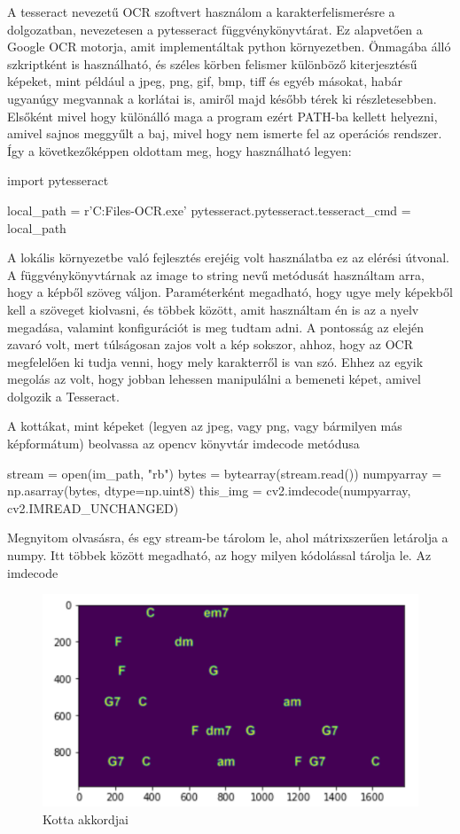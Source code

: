 A tesseract nevezetű OCR szoftvert használom a karakterfelismerésre a dolgozatban, nevezetesen a pytesseract függvénykönyvtárat. Ez alapvetően a Google OCR motorja, amit implementáltak python környezetben. Önmagába álló szkriptként is használható, és széles körben felismer különböző kiterjesztésű képeket, mint például a jpeg, png, gif, bmp, tiff és egyéb másokat, habár ugyanúgy megvannak a korlátai is, amiről majd később térek ki részletesebben. Elsőként mivel hogy különálló maga a program ezért PATH-ba kellett helyezni, amivel sajnos meggyűlt a baj, mivel hogy nem ismerte fel az operációs rendszer. Így a következőképpen oldottam meg, hogy használható legyen:
\begin{python}
	import pytesseract
	
	local_path =  r'C:\Program Files\Tesseract-OCR\tesseract.exe'
	pytesseract.pytesseract.tesseract_cmd = local_path
\end{python}
A lokális környezetbe való fejlesztés erejéig volt használatba ez az elérési útvonal. A függvénykönyvtárnak az image to string nevű metódusát használtam arra, hogy a képből szöveg váljon. Paraméterként megadható, hogy ugye mely képekből kell a szöveget kiolvasni, és többek között, amit használtam én is az a nyelv megadása, valamint konfigurációt is meg tudtam adni. A pontosság az elején zavaró volt, mert túlságosan zajos volt a kép sokszor, ahhoz, hogy az OCR megfelelően ki tudja venni, hogy mely karakterről is van szó. Ehhez az egyik megolás az volt, hogy jobban lehessen manipulálni a bemeneti képet, amivel dolgozik a Tesseract.
\par
{}
A kottákat, mint képeket (legyen az jpeg, vagy png, vagy bármilyen más képformátum) beolvassa az opencv könyvtár imdecode metódusa
\begin{python}
stream = open(im_path, "rb")
bytes = bytearray(stream.read())
numpyarray = np.asarray(bytes, dtype=np.uint8)
this_img = cv2.imdecode(numpyarray, cv2.IMREAD_UNCHANGED)
\end{python}
Megnyitom olvasásra, és egy stream-be tárolom le, ahol mátrixszerűen letárolja a numpy. Itt többek között megadható, az hogy milyen kódolással tárolja le. Az imdecode

\begin{figure}[h]
	\includegraphics[scale=0.5]{images/output_justchords.png}
	\caption{Kotta akkordjai}
	\label{fig:output2}
\end{figure}


